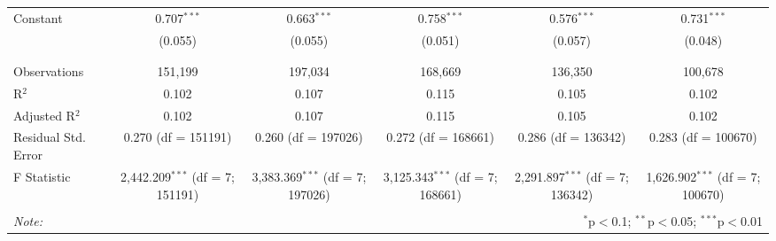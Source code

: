 \begin{table}[!htbp]
\begin{tabular}{@{\extracolsep{5pt}}lccccc}
 Constant & 0.707$^{***}$ & 0.663$^{***}$ & 0.758$^{***}$ & 0.576$^{***}$ & 0.731$^{***}$ \\ 
  & (0.055) & (0.055) & (0.051) & (0.057) & (0.048) \\ 
  & & & & & \\ 
\hline \\[-1.8ex] 
Observations & 151,199 & 197,034 & 168,669 & 136,350 & 100,678 \\ 
R$^{2}$ & 0.102 & 0.107 & 0.115 & 0.105 & 0.102 \\ 
Adjusted R$^{2}$ & 0.102 & 0.107 & 0.115 & 0.105 & 0.102 \\ 
Residual Std. Error & 0.270 (df = 151191) & 0.260 (df = 197026) & 0.272 (df = 168661) & 0.286 (df = 136342) & 0.283 (df = 100670) \\ 
F Statistic & 2,442.209$^{***}$ (df = 7; 151191) & 3,383.369$^{***}$ (df = 7; 197026) & 3,125.343$^{***}$ (df = 7; 168661) & 2,291.897$^{***}$ (df = 7; 136342) & 1,626.902$^{***}$ (df = 7; 100670) \\ 
\hline 
\hline \\[-1.8ex] 
\textit{Note:}  & \multicolumn{5}{r}{$^{*}$p$<$0.1; $^{**}$p$<$0.05; $^{***}$p$<$0.01} \\ 
\end{tabular} 
\end{table} 
